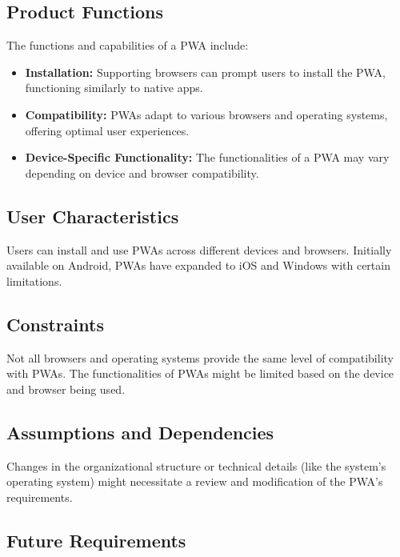 \documentclass[12pt,a4paper, twosite]{article}
\begin{document}
\subsection{Product Functions}
\label{sec:orgaf51da6}

The functions and capabilities of a PWA include:
\begin{itemize}

\item \textbf{Installation: }Supporting browsers can prompt users to install the PWA, functioning similarly to native apps.
\item \textbf{Compatibility: }PWAs adapt to various browsers and operating systems, offering optimal user experiences.
\item \textbf{Device-Specific Functionality: }The functionalities of a PWA may vary depending on device and browser compatibility.

\end{itemize}

\subsection{User Characteristics}
\label{sec:orga40b0ee}

Users can install and use PWAs across different devices and browsers. Initially available on Android, PWAs have expanded to iOS and Windows with certain limitations.


\subsection{Constraints}
\label{sec:org5ca5790}

Not all browsers and operating systems provide the same level of compatibility with PWAs. The functionalities of PWAs might be limited based on the device and browser being used.

\subsection{Assumptions and Dependencies}
\label{sec:org0ae23fe}

Changes in the organizational structure or technical details 
(like the system's operating system) might necessitate a 
review and modification of the PWA's requirements.

\subsection{Future Requirements}
\label{sec:org33cfcdb}
\end{document}
